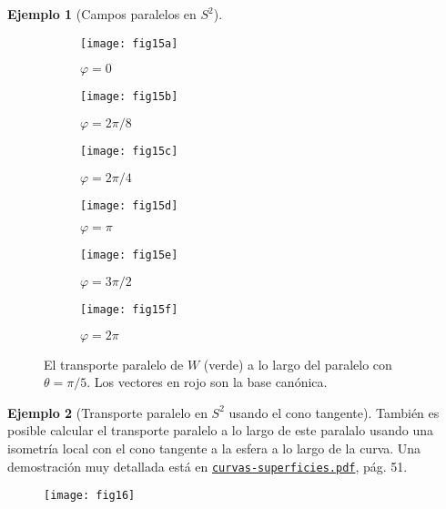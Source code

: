 \documentclass[spanish]{book}
\theoremstyle{definition}
\newtheorem*{ejem}{Ejemplo}
\begin{document}
\begin{ejem}[Campos paralelos en $S^2$]
		\begin{figure}[H]
			\begin{center}
				\begin{subfigure}[t]{0.4\linewidth}
					\centering
					\texttt{[image: fig15a]}
					\caption*{$\varphi=0$}
				\end{subfigure}
				\begin{subfigure}[t]{0.4\linewidth}
					\centering
					\texttt{[image: fig15b]}
					\caption*{$\varphi=2\pi/8$}
				\end{subfigure}
				\begin{subfigure}[t]{0.4\linewidth}
					\centering
					\texttt{[image: fig15c]}
					\caption*{$\varphi=2\pi/4$}
				\end{subfigure}
				\begin{subfigure}[t]{0.4\linewidth}
					\centering
					\texttt{[image: fig15d]}
					\caption*{$\varphi=\pi$}
				\end{subfigure}
				\begin{subfigure}[t]{0.4\linewidth}
					\centering
					\texttt{[image: fig15e]}
					\caption*{$\varphi=3\pi/2$}
				\end{subfigure}
				\begin{subfigure}[t]{0.4\linewidth}
					\centering
					\texttt{[image: fig15f]}
					\caption*{$\varphi=2\pi$}
				\end{subfigure}
			\end{center}
			\caption*{El transporte paralelo de $W$ (verde) a lo largo del paralelo con $\theta=\pi/5$. Los vectores en rojo son la base canónica.}
		\end{figure}
	\end{ejem}
	
	\begin{ejem}[Transporte paralelo en $S^2$ usando el cono tangente]
		También es posible calcular el transporte paralelo a lo largo de este paralalo usando una isometría local con el cono tangente a la esfera a lo largo de la curva. Una demostración muy detallada está en \href{https://github.com/dan-gc/curvas-superficies/blob/main/curvas-superficies.pdf}{\texttt{curvas-superficies.pdf}}, pág. 51.
		\begin{figure}[H]
			\begin{center}
				\centering
				\texttt{[image: fig16]}
			\end{center}
		\end{figure}
	\end{ejem}
	
\end{document}
